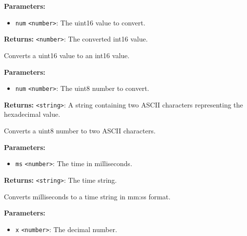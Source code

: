 \documentclass[12pt,a4paper]{article}
\begin{document}
\noindent \textbf{Parameters:}
\begin{itemize}
  \item \texttt{num} \texttt{<number>}: The uint16 value to convert.
\end{itemize}

\noindent \textbf{Returns:} \texttt{<number>}: The converted int16 value.

\noindent Converts a uint16 value to an int16 value.

\vspace{5mm}
\noindent {}


\noindent \textbf{Parameters:}
\begin{itemize}
  \item \texttt{num} \texttt{<number>}: The uint8 number to convert.
\end{itemize}

\noindent \textbf{Returns:} \texttt{<string>}: A string containing two ASCII characters representing the hexadecimal value.

\noindent Converts a uint8 number to two ASCII characters.

\vspace{5mm}
\noindent {}


\noindent \textbf{Parameters:}
\begin{itemize}
  \item \texttt{ms} \texttt{<number>}: The time in milliseconds.
\end{itemize}

\noindent \textbf{Returns:} \texttt{<string>}: The time string.

\noindent Converts milliseconds to a time string in mm:ss format.

\vspace{5mm}
\noindent {}


\noindent \textbf{Parameters:}
\begin{itemize}
  \item \texttt{x} \texttt{<number>}: The decimal number.
\end{itemize}
\end{document}
